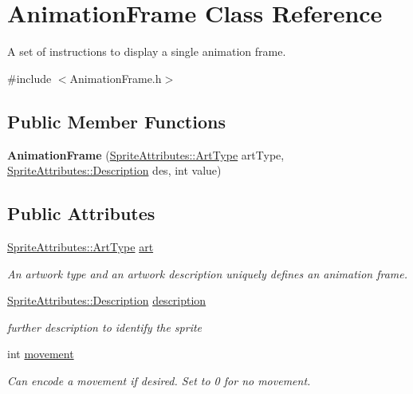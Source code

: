 \hypertarget{class_animation_frame}{}\section{Animation\+Frame Class Reference}
\label{class_animation_frame}


A set of instructions to display a single animation frame.  




{\ttfamily \#include $<$Animation\+Frame.\+h$>$}

\subsection*{Public Member Functions}
\begin{DoxyCompactItemize}
\item 
\mbox{\label{class_animation_frame_aad54a48cf9fa1b3d69b065d1eb265be3}} 
{\bfseries Animation\+Frame} (\mbox{\hyperlink{namespace_sprite_attributes_afb5447c311bc29f0ce8ddfd025c6e998}{Sprite\+Attributes\+::\+Art\+Type}} art\+Type, \mbox{\hyperlink{namespace_sprite_attributes_a3ece96d6288b14d53d84e2138392395c}{Sprite\+Attributes\+::\+Description}} des, int value)
\end{DoxyCompactItemize}
\subsection*{Public Attributes}
\begin{DoxyCompactItemize}
\item 
\mbox{\hyperlink{namespace_sprite_attributes_afb5447c311bc29f0ce8ddfd025c6e998}{Sprite\+Attributes\+::\+Art\+Type}} \mbox{\hyperlink{class_animation_frame_a53f604dd1cb7006607cf5133198baaaa}{art}}
\begin{DoxyCompactList}\small\item\em An artwork type and an artwork description uniquely defines an animation frame. \end{DoxyCompactList}\item 
\mbox{\label{class_animation_frame_a0f8fbedef1fa2d1a1fdfdef9e1b25a59}} 
\mbox{\hyperlink{namespace_sprite_attributes_a3ece96d6288b14d53d84e2138392395c}{Sprite\+Attributes\+::\+Description}} \mbox{\hyperlink{class_animation_frame_a0f8fbedef1fa2d1a1fdfdef9e1b25a59}{description}}
\begin{DoxyCompactList}\small\item\em further description to identify the sprite \end{DoxyCompactList}\item 
\mbox{\label{class_animation_frame_a1bff02b7750ac68516ef155073f14487}} 
int \mbox{\hyperlink{class_animation_frame_a1bff02b7750ac68516ef155073f14487}{movement}}
\begin{DoxyCompactList}\small\item\em Can encode a movement if desired. Set to 0 for no movement. \end{DoxyCompactList}\end{DoxyCompactItemize}


